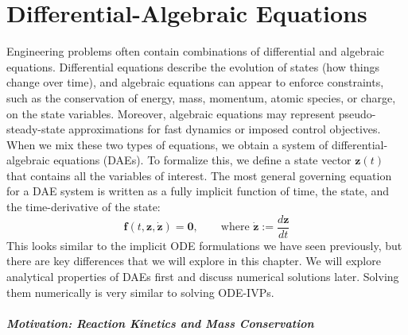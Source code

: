\chapter{Differential-Algebraic Equations}

Engineering problems often contain combinations of differential and algebraic equations. Differential equations describe the evolution of states (how things change over time), and algebraic equations can appear to enforce constraints, such as the conservation of energy, mass, momentum, atomic species, or charge, on the state variables. Moreover, algebraic equations may represent pseudo-steady-state approximations for fast dynamics or imposed control objectives. When we mix these two types of equations, we obtain a system of differential-algebraic equations (DAEs). To formalize this, we define a state vector $\mathbf{z}(t)$ that contains all the variables of interest. The most general governing equation for a DAE system is written as a fully implicit function of time, the state, and the time-derivative of the state:
\begin{equation}
    \mathbf{f}(t, \mathbf{z}, \dot{\mathbf{z}}) = \mathbf{0}, \qquad \text{where } \dot{\mathbf{z}} := \frac{d\mathbf{z}}{dt}
\end{equation}
This looks similar to the implicit ODE formulations we have seen previously, but there are key differences that we will explore in this chapter. %
We will explore analytical properties of DAEs first and discuss numerical solutions later. Solving them numerically is very similar to solving ODE-IVPs.

\paragraph*{Motivation: Reaction Kinetics and Mass Conservation}

